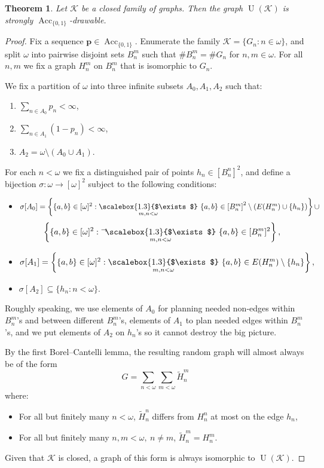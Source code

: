 \documentclass{amsart}
\newtheorem{theorem}{Theorem}[section]
\theoremstyle{plain}
\theoremstyle{definition}
\theoremstyle{remark}
\numberwithin{equation}{section}
\DeclareMathOperator{\UN}{U}
\DeclareMathOperator{\Acc}{Acc}
\begin{document}
\begin{theorem}\label{T:GenerowanieK}
Let \(\mathcal{K}\) be a closed family of graphs.  Then the graph \(\UN(\mathcal{K})\) is strongly $\Acc_{\{0,1\}}$-drawable. 
\end{theorem}
\begin{proof}
Fix a sequence $\mathbf{p}\in \Acc_{\{0,1\}}$. Enumerate the family \(\mathcal{K}=\{G_{n} : n\in\omega\}\), and split \(\omega\) into pairwise disjoint sets \(B_{n}^{m}\) such that \(\#B_{n}^{m}=\#G_{n}\) for \(n,m\in\omega\).  For all \(n,m\) we fix a graph \(H_{n}^{m}\) on \(B_{n}^{m}\) that is isomorphic to \(G_{n}\). 

We fix a partition of $\omega$ into three infinite subsets $A_0,A_1, A_2$ such that:
\begin{enumerate}
    \item $\sum\limits_{n\in A_0}p_n<\infty$,
    \item $\sum\limits_{n\in A_1}\left(1-p_n\right)<\infty$,
    \item $A_2=\omega \setminus (A_0\cup A_1)$.
\end{enumerate}
For each $n<\omega$ we fix a distinguished pair of points $h_n\in [B_n^n]^2$, and define a bijection $\sigma:\omega\rightarrow [\omega]^2$ subject to the following conditions:
\begin{itemize}
\item $\sigma[A_0]=\left\{\{a,b\} \in [\omega]^2 : \mathop{\scalebox{1.3}{$\exists$}}\limits_{\substack{m,n<\omega}}  \ \{a,b\} \in \left[B^m_n\right]^2\setminus \left(E(H^m_n)\cup\{h_n\}\right)\right\}\cup$
$$\left\{\{a,b\} \in [\omega]^2 : \raisebox{0.5ex}{$\neg$}\!\!\mathop{\scalebox{1.3}{$\exists$}}\limits_{\substack{m,n<\omega}}  \  \{a,b\} \in [B_n^m]^2\right\},$$
\item $\sigma[A_1]=\left\{\{a,b\} \in [\omega]^2 :
\mathop{\scalebox{1.3}{$\exists$}}\limits_{\substack{m,n<\omega}} \  \{a,b\} \in E(H^m_n)\setminus\{h_n\}\right\},$
\item $\sigma[A_2]\subseteq \{h_n : n<\omega\}.$
\end{itemize}
Roughly speaking, we use elements of $A_0$ for planning needed non-edges within $B_n^m$'s and between different $B_n^m$'s, elements of $A_1$ to plan needed edges within $B_n^m$'s, and we put elements of $A_2$ on $h_n$'s so it cannot destroy the big picture. 

By the first Borel--Cantelli lemma, the resulting random graph will almost always be of the form
$$G=\sum\limits_{n<\omega} \sum\limits_{m<\omega}\tilde{H}_n^m$$
where:
\begin{itemize}
    \item For all but finitely many $n<\omega$, $\tilde{H}_n^n$ differs from $H^n_n$ at most on the edge $h_n$,
    \item For all but finitely many $n,m<\omega,\ n\neq m$, $\tilde{H}_n^m=H^m_n$.
\end{itemize}
Given that $\mathcal K$ is closed, a graph of this form is always isomorphic to
\(\UN(\mathcal{K})\).
\end{proof}
\end{document}

